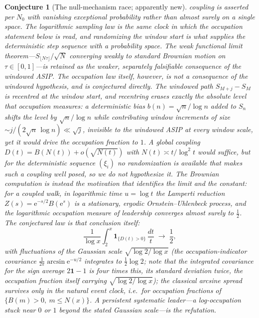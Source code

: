 \documentclass[11pt]{article}
\newtheorem{conjecture}{Conjecture}
\theoremstyle{definition}
\newcommand{\e}{\mathrm{e}}
\begin{document}
\begin{conjecture}[The null-mechanism race; apparently new]
coupling is asserted per $N_0$ with vanishing exceptional
probability rather than almost surely on a single space.  The
logarithmic sampling law is the same clock in which the occupation
statement below is read, and randomizing the window start is what
supplies the deterministic step sequence with a probability space.
The weak
functional limit theorem---$S_{\lfloor N\tau\rfloor}/\sqrt N$
converging weakly to standard Brownian motion on
$\tau\in[0,1]$---is retained as the weaker, separately
falsifiable consequence of the windowed ASIP.  The occupation law
itself, however, is \emph{not} a consequence of the windowed
hypothesis, and is conjectured directly.  The windowed path
$S_{M+j}-S_M$ is recentred at the window start, and recentring
erases exactly the absolute level that occupation measures: a
deterministic bias $b(n)=\sqrt n/\log n$ added to $S_n$ shifts the
level by $\sqrt n/\log n$ while contributing window increments of
size ${\sim}j/(2\sqrt n\,\log n)\ll\sqrt j$, invisible to the
windowed ASIP at every window scale, yet it would drive the
occupation fraction to $1$.  A global coupling
$D(t)=B(N(t))+o(\sqrt{N(t)})$
with $N(t)\asymp t/\log^2t$ would suffice, but for the
deterministic sequence $(\xi_i)$ no randomization is available that
makes such a coupling well posed, so we do not hypothesize it.  The
Brownian computation is instead the motivation that identifies the
limit and the constant: for a coupled walk, in \emph{logarithmic}
time
$u=\log t$ the
Lamperti reduction $Z(s)=\e^{-s/2}B(\e^s)$ is a stationary, ergodic
Ornstein--Uhlenbeck process, and the logarithmic occupation measure
of leadership converges almost surely to $\tfrac12$.  The
conjectured law is that conclusion itself:
\[
\frac1{\log x}\int_2^x\mathbf 1_{\{D(t)>0\}}\,\frac{dt}t
\;\longrightarrow\;\frac12,
\]
with fluctuations of the Gaussian scale
$\sqrt{\log2/\log x}$ (the occupation-indicator covariance
$\frac1{2\pi}\arcsin\e^{-u/2}$ integrates to $\tfrac12\log2$; note that the integrated covariance for the \emph{sign} average $2\mathbf 1-1$ is four times this, its standard deviation twice, the occupation fraction itself carrying
$\sqrt{\log2/\log x}$); the classical
arcsine spread survives only in the \emph{natural} event clock,
i.e.\ for occupation fractions of $\{B(m)>0,\ m\le N(x)\}$.  A
persistent systematic leader---a log-occupation stuck near $0$ or
$1$ beyond the stated Gaussian scale---is the refutation.
\end{conjecture}
\end{document}
